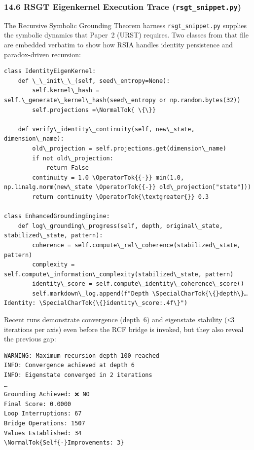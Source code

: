 \documentclass[12pt]{article}
\begin{document}
\subsubsection{\texorpdfstring{14.6 RSGT Eigenkernel Execution Trace
(\texttt{rsgt\_snippet.py})}{14.6 RSGT Eigenkernel Execution Trace (rsgt\_snippet.py)}}\label{rsgt-eigenkernel-execution-trace-rsgt_snippet.py}

The Recursive Symbolic Grounding Theorem harness
\texttt{rsgt\_snippet.py} supplies the symbolic dynamics that Paper~2
(URST) requires. Two classes from that file are embedded verbatim to
show how RSIA handles identity persistence and paradox-driven recursion:

\begin{lstlisting}[basicstyle=\ttfamily\small]
class IdentityEigenKernel:
    def \_\_init\_\_(self, seed\_entropy=None):
        self.kernel\_hash = self.\_generate\_kernel\_hash(seed\_entropy or np.random.bytes(32))
        self.projections =\NormalTok{ \{\}}

    def verify\_identity\_continuity(self, new\_state, dimension\_name):
        old\_projection = self.projections.get(dimension\_name)
        if not old\_projection:
            return False
        continuity = 1.0 \OperatorTok{{-}} min(1.0, np.linalg.norm(new\_state \OperatorTok{{-}} old\_projection["state"]))
        return continuity \OperatorTok{\textgreater{}} 0.3

class EnhancedGroundingEngine:
    def log\_grounding\_progress(self, depth, original\_state, stabilized\_state, pattern):
        coherence = self.compute\_ral\_coherence(stabilized\_state, pattern)
        complexity = self.compute\_information\_complexity(stabilized\_state, pattern)
        identity\_score = self.compute\_identity\_coherence\_score()
        self.markdown\_log.append(f"Depth \SpecialCharTok{\{}depth\}… Identity: \SpecialCharTok{\{}identity\_score:.4f\}")
\end{lstlisting}

Recent runs demonstrate convergence (depth~6) and eigenstate stability
(≤3 iterations per axis) even before the RCF bridge is invoked, but they
also reveal the previous gap:

\begin{lstlisting}[basicstyle=\ttfamily\small]
WARNING: Maximum recursion depth 100 reached
INFO: Convergence achieved at depth 6
INFO: Eigenstate converged in 2 iterations
…
Grounding Achieved: ❌ NO
Final Score: 0.0000
Loop Interruptions: 67
Bridge Operations: 1507
Values Established: 34
\NormalTok{Self{-}Improvements: 3}
\end{lstlisting}
\end{document}
